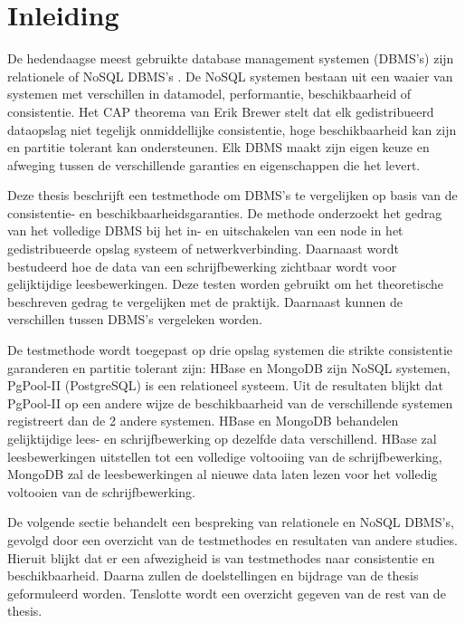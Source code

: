 \chapter{Inleiding}
De hedendaagse meest gebruikte database management systemen (DBMS's) zijn relationele of NoSQL DBMS's \cite{dbengine-ranking}. De NoSQL systemen bestaan uit een waaier van systemen met verschillen in datamodel, performantie, beschikbaarheid of consistentie. 
Het CAP theorema van Erik Brewer\cite{Brewer:2000:TRD:343477.343502} stelt dat elk gedistribueerd dataopslag niet tegelijk onmiddellijke consistentie, hoge beschikbaarheid kan zijn en partitie tolerant kan ondersteunen. Elk DBMS maakt zijn eigen keuze en afweging tussen de verschillende garanties en eigenschappen die het levert. 

Deze thesis beschrijft een testmethode om DBMS's te vergelijken op basis van de consistentie- en beschikbaarheidsgaranties. De methode onderzoekt het gedrag van het volledige DBMS bij het in- en uitschakelen van een node in het gedistribueerde opslag systeem of netwerkverbinding. Daarnaast wordt bestudeerd hoe de data van een schrijfbewerking zichtbaar wordt voor gelijktijdige leesbewerkingen. Deze testen worden gebruikt om het theoretische beschreven gedrag te vergelijken met de praktijk. Daarnaast kunnen de verschillen tussen DBMS's vergeleken worden.

De testmethode wordt toegepast op drie opslag systemen die strikte consistentie garanderen en partitie tolerant zijn: HBase en MongoDB zijn NoSQL systemen, PgPool-II (PostgreSQL) is een relationeel systeem. Uit de resultaten blijkt dat PgPool-II op een andere wijze de beschikbaarheid van de verschillende systemen registreert dan de 2 andere systemen. HBase en MongoDB behandelen gelijktijdige lees- en schrijfbewerking op dezelfde data verschillend. HBase zal leesbewerkingen uitstellen tot een volledige voltooiing van de schrijfbewerking, MongoDB zal de leesbewerkingen al nieuwe data laten lezen voor het volledig voltooien van de schrijfbewerking. 

De volgende sectie behandelt een bespreking van relationele en NoSQL DBMS's, gevolgd door een overzicht van de testmethodes en resultaten van andere studies. Hieruit blijkt dat er een afwezigheid is van testmethodes naar consistentie en beschikbaarheid. Daarna zullen de doelstellingen en bijdrage van de thesis geformuleerd worden. Tenslotte wordt een overzicht gegeven van de rest van de thesis. 


